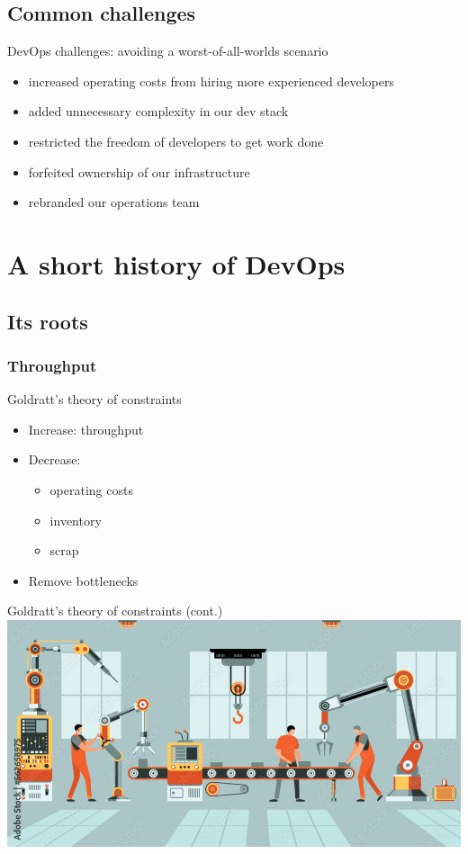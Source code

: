 \documentclass{beamer}
\begin{document}
	\subsection{Common challenges}
	\begin{frame}{DevOps challenges: avoiding a worst-of-all-worlds scenario}
		\begin{itemize}
			\item increased operating costs from hiring more experienced developers \pause
			\item added unnecessary complexity in our dev stack \pause
			\item restricted the freedom of developers to get work done \pause
			\item forfeited ownership of our infrastructure \pause 
			\item rebranded our operations team
		\end{itemize}
	\end{frame}
	\section{A short history of DevOps}
	\subsection{Its roots}
	\subsubsection{Throughput}
\begin{frame}{Goldratt's theory of constraints}
	\begin{itemize}
		\item Increase: throughput \pause
		\item Decrease: \pause
		\begin{itemize}
			\item operating costs \pause
			\item inventory \pause
			\item scrap \pause
		\end{itemize}
		\item Remove bottlenecks
	\end{itemize}
\end{frame}
\begin{frame}{Goldratt's theory of constraints (cont.)}
	\includegraphics{assemblyline}
\end{frame}
\end{document}
